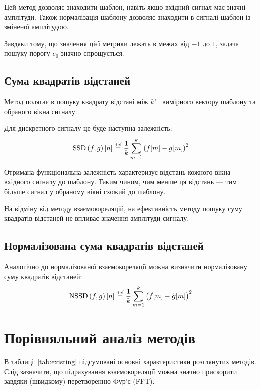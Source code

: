         Цей метод дозволяє знаходити шаблон, навіть якщо вхідний сигнал має значні  амплітуди.
        Також нормалізація шаблону дозволяє знаходити в сигналі шаблон із зміненої амплітудою.

        Завдяки тому, що значення цієї метрики лежать в межах від ${-1}$ до $1$, задача пошуку порогу $e_0$ значно
        спрощується.

    \subsection{Сума квадратів відстаней}
        Метод полягає в пошуку квадрату відстані між $k$"=вимірного вектору шаблону та обраного вікна сигналу.

        Для дискретного сигналу це буде наступна залежність:
        \begin{equation}
            \text{SSD}\left(f, g\right)[ n ] \stackrel{\text{def}}{=} \frac{1}{k}\sum\limits_{m=1}^k {\left(f[m] - g[m]\right)}^2
        \end{equation}

        Отримана функціональна залежність характеризує відстань кожного вікна вхідного сигналу до шаблону.
        Таким чином, чим менше ця відстань --- тим більше сигнал у обраному вікні схожий до шаблону.

        На відміну від методу взаємокореляцій, на ефективність методу пошуку суму квадратів відстаней не впливає
        значення амплітуди сигналу.
    \subsection{Нормалізована сума квадратів відстаней}
        Аналогічно до нормалізованої взаємокореляції можна визначити нормалізовану суму квадратів відстаней:
        \begin{equation}
            \text{NSSD}\left(f, g\right)[ n ] \stackrel{\text{def}}{=} \frac{1}{k}\sum\limits_{m=1}^k {\left(\tilde{f}[m] - \tilde{g}[m]\right)}^2
        \end{equation}

\section{Порівняльний аналіз методів}
\label{s:existing-compare}
    В таблиці~\ref{tab:existing} підсумовані основні характеристики розглянутих методів.
    Слід зазначити, що підрахування взаємокореляції можна значно прискорити завдяки (швидкому) перетворенню Фур’є
    (FFT).

